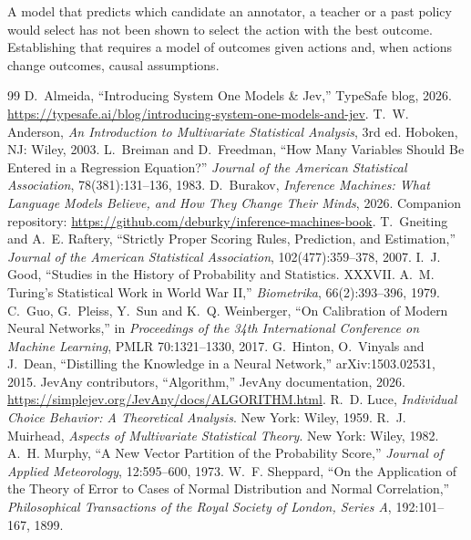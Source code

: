 \documentclass[11pt]{article}
\theoremstyle{remark}
\newcommand{\1}{\mathbf 1}
\begin{document}
A model that predicts which candidate an annotator, a teacher or a past policy would select has not been shown to select the action with the best outcome. Establishing that requires a model of outcomes given actions and, when actions change outcomes, causal assumptions.

\begin{thebibliography}{99}
 D.~Almeida, ``Introducing System One Models \& Jev,'' TypeSafe blog, 2026. \url{https://typesafe.ai/blog/introducing-system-one-models-and-jev}.
 T.~W. Anderson, \emph{An Introduction to Multivariate Statistical Analysis}, 3rd ed. Hoboken, NJ: Wiley, 2003.
 L.~Breiman and D.~Freedman, ``How Many Variables Should Be Entered in a Regression Equation?'' \emph{Journal of the American Statistical Association}, 78(381):131--136, 1983.
 D.~Burakov, \emph{Inference Machines: What Language Models Believe, and How They Change Their Minds}, 2026. Companion repository: \url{https://github.com/deburky/inference-machines-book}.
 T.~Gneiting and A.~E. Raftery, ``Strictly Proper Scoring Rules, Prediction, and Estimation,'' \emph{Journal of the American Statistical Association}, 102(477):359--378, 2007.
 I.~J. Good, ``Studies in the History of Probability and Statistics. XXXVII. A.~M. Turing's Statistical Work in World War II,'' \emph{Biometrika}, 66(2):393--396, 1979.
 C.~Guo, G.~Pleiss, Y.~Sun and K.~Q. Weinberger, ``On Calibration of Modern Neural Networks,'' in \emph{Proceedings of the 34th International Conference on Machine Learning}, PMLR 70:1321--1330, 2017.
 G.~Hinton, O.~Vinyals and J.~Dean, ``Distilling the Knowledge in a Neural Network,'' arXiv:1503.02531, 2015.
 JevAny contributors, ``Algorithm,'' JevAny documentation, 2026. \url{https://simplejev.org/JevAny/docs/ALGORITHM.html}.
 R.~D. Luce, \emph{Individual Choice Behavior: A Theoretical Analysis}. New York: Wiley, 1959.
 R.~J. Muirhead, \emph{Aspects of Multivariate Statistical Theory}. New York: Wiley, 1982.
 A.~H. Murphy, ``A New Vector Partition of the Probability Score,'' \emph{Journal of Applied Meteorology}, 12:595--600, 1973.
 W.~F. Sheppard, ``On the Application of the Theory of Error to Cases of Normal Distribution and Normal Correlation,'' \emph{Philosophical Transactions of the Royal Society of London, Series A}, 192:101--167, 1899.
\end{thebibliography}
\end{document}
